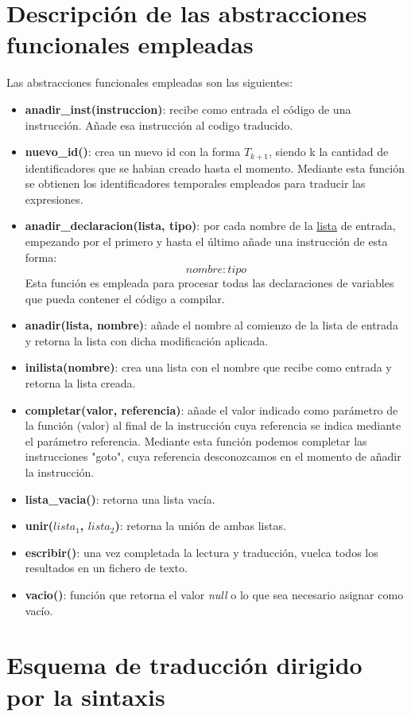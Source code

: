 \documentclass[12pt,a4paper, landscape]{article}
\theoremstyle{mytheor}
\begin{document}
\newpage
\section{Descripción de las abstracciones funcionales empleadas}
Las abstracciones funcionales empleadas son las siguientes:
\begin{itemize}
  \item \textbf{anadir\_inst(instruccion)}: recibe como entrada el código de una instrucción. Añade esa instrucción al codigo traducido.
  \item \textbf{nuevo\_id()}: crea un nuevo id con la forma $T_{k+1}$, siendo k la cantidad de identificadores que se habian creado hasta el momento. Mediante esta función se obtienen los identificadores temporales empleados para traducir las expresiones.
  \item \textbf{anadir\_declaracion(lista, tipo)}: por cada nombre de la \underline{lista} de entrada, empezando por el primero y hasta el último añade una instrucción de esta forma: \[nombre : tipo\] Esta función es empleada para procesar todas las declaraciones de variables que pueda contener el código a compilar.
  \item \textbf{anadir(lista, nombre)}: añade el nombre al comienzo de la lista de entrada y retorna la lista con dicha modificación aplicada.
  \item \textbf{inilista(nombre)}: crea una lista con el nombre que recibe como entrada y retorna la lista creada.
  \item \textbf{completar(valor, referencia)}: añade el valor indicado como parámetro de la función (valor) al final de la instrucción cuya referencia se indica mediante el parámetro referencia. Mediante esta función podemos completar las instrucciones "goto", cuya referencia desconozcamos en el momento de añadir la instrucción.
  \item \textbf{lista\_vacia()}: retorna una lista vacía.
  \item \textbf{unir($lista_1$, $lista_2$)}: retorna la unión de ambas listas.
  \item \textbf{escribir()}: una vez completada la lectura y traducción, vuelca todos los resultados en un fichero de texto.
  \item \textbf{vacio()}: función que retorna el valor \textit{null} o lo que sea necesario asignar como vacío.
\end{itemize}


\section{Esquema de traducción dirigido por la sintaxis}
\end{document}
